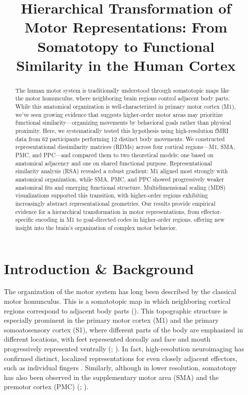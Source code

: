 \documentclass{article}
\title{ Hierarchical Transformation of Motor Representations: From Somatotopy to Functional Similarity in the Human Cortex}
\begin{document}
\maketitle


\begin{abstract}

The human motor system is traditionally understood through somatotopic maps like the motor homunculus, where neighboring brain regions control adjacent body parts. While this anatomical organization is well-characterized in primary motor cortex (M1), we've seen growing evidence that suggests higher-order motor areas may prioritize functional similarity—organizing movements by behavioral goals rather than physical proximity. Here, we systematically tested this hypothesis using high-resolution fMRI data from 62 participants performing 12 distinct body movements. We constructed representational dissimilarity matrices (RDMs) across four cortical regions—M1, SMA, PMC, and PPC—and compared them to two theoretical models: one based on anatomical adjacency and one on shared functional purpose. Representational similarity analysis (RSA) revealed a robust gradient: M1 aligned most strongly with anatomical organization, while SMA, PMC, and PPC showed progressively weaker anatomical fits and emerging functional structure. Multidimensional scaling (MDS) visualizations supported this transition, with higher-order regions exhibiting increasingly abstract representational geometries. Our results provide empirical evidence for a hierarchical transformation in motor representations, from effector-specific encoding in M1 to goal-directed codes in higher-order regions, offering new insight into the brain's organization of complex motor behavior.
\end{abstract}

\section{Introduction \& Background}

The organization of the motor system has long been described by the classical motor homunculus. This is a somatotopic map in which neighboring cortical regions correspond to adjacent body parts (\cite{penfield}). This topographic structure is especially prominent in the primary motor cortex (M1) and the primary somoatosensory cortex (S1), where different parts of the body are emphasized in different locations, with feet represented dorsally and face and mouth progressively represented ventrally (\cite{meier2008}; \cite{zeharia2012}). In fact, high-resolution neuroimaging has confirmed distinct, localized representations for even closely adjacent effectors, such as individual fingers \citep{ejaz2015}. Similarly, although in lower resolution, somatotopy has also been observed in the supplementary motor area (SMA) and the premotor cortex (PMC) (\cite{sma}; \citep{pmc}).
\end{document}
